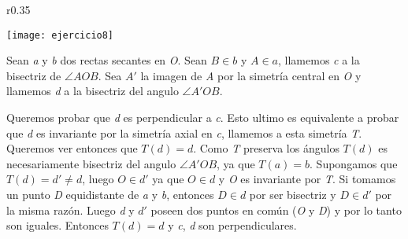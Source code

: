 \documentclass[12pt,a4paper]{article}
\begin{document}
			\begin{wrapfigure}[11]{r}{0.35\textwidth}
				\begin{center}
					\texttt{[image: ejercicio8]}
				\end{center}
			\end{wrapfigure}
		Sean \textit{a} y \textit{b} dos rectas secantes en \textit{O}. Sean \(B \in b \) y \( A \in a \), llamemos \textit{c} a la bisectriz de \( \angle AOB\). Sea \(A'\) la imagen de \textit{A} por la simetría central en \textit{O} y llamemos \textit{d} a la bisectriz del angulo \( \angle A'OB\).
		
		Queremos probar que \textit{d} es perpendicular a \textit{c}. Esto ultimo es equivalente a probar que \textit{d} es invariante por la simetría axial en \textit{c}, llamemos a esta simetría \textit{T}. Queremos ver entonces que \(T(d) = d\). Como \textit{T} preserva los ángulos \(T(d)\) es necesariamente bisectriz del angulo \( \angle A'OB \), ya que \(T(a)=b\). Supongamos que \(T(d) = d' \neq d \), luego \(O \in d' \) ya que \(O \in d \) y \textit{O} es invariante por \textit{T}. Si tomamos un punto \textit{D} equidistante de \textit{a} y \textit{b}, entonces \(D \in d \) por ser bisectriz y \(D \in d' \) por la misma razón. Luego \textit{d} y \(d'\) poseen dos puntos en común (\textit{O} y \textit{D}) y por lo tanto son iguales. Entonces \(T(d) = d\) y \textit{c}, \textit{d} son perpendiculares.
\end{document}
